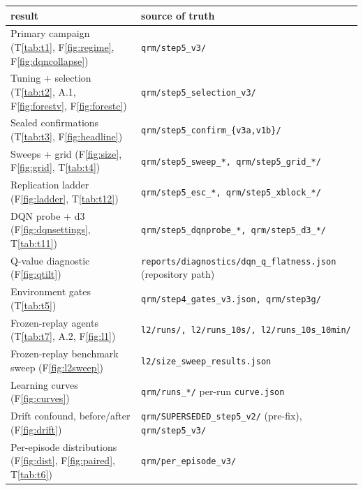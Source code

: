 \documentclass[11pt]{article}
\begin{document}
\begin{center}\small
\begin{tabular}{ll}
\toprule
result & source of truth \\
\midrule
Primary campaign (T\ref{tab:t1}, F\ref{fig:regime}, F\ref{fig:dqncollapse}) & \texttt{qrm/step5\_v3/} \\
Tuning + selection (T\ref{tab:t2}, A.1, F\ref{fig:forestv}, F\ref{fig:forestc}) & \texttt{qrm/step5\_selection\_v3/} \\
Sealed confirmations (T\ref{tab:t3}, F\ref{fig:headline}) & \texttt{qrm/step5\_confirm\_\{v3a,v1b\}/} \\
Sweeps + grid (F\ref{fig:size}, F\ref{fig:grid}, T\ref{tab:t4}) & \texttt{qrm/step5\_sweep\_*, qrm/step5\_grid\_*/} \\
Replication ladder (F\ref{fig:ladder}, T\ref{tab:t12}) & \texttt{qrm/step5\_esc\_*, qrm/step5\_xblock\_*/} \\
DQN probe + d3 (F\ref{fig:dqnsettings}, T\ref{tab:t11}) & \texttt{qrm/step5\_dqnprobe\_*, qrm/step5\_d3\_*/} \\
Q-value diagnostic (F\ref{fig:qtilt}) & \texttt{reports/diagnostics/dqn\_q\_flatness.json} (repository path) \\
Environment gates (T\ref{tab:t5}) & \texttt{qrm/step4\_gates\_v3.json, qrm/step3g/} \\
Frozen-replay agents (T\ref{tab:t7}, A.2, F\ref{fig:l1}) & \texttt{l2/runs/, l2/runs\_10s/, l2/runs\_10s\_10min/} \\
Frozen-replay benchmark sweep (F\ref{fig:l2sweep}) & \texttt{l2/size\_sweep\_results.json} \\
Learning curves (F\ref{fig:curves}) & \texttt{qrm/runs\_*/} per-run \texttt{curve.json} \\
Drift confound, before/after (F\ref{fig:drift}) & \texttt{qrm/SUPERSEDED\_step5\_v2/} (pre-fix), \texttt{qrm/step5\_v3/} \\
Per-episode distributions (F\ref{fig:dist}, F\ref{fig:paired}, T\ref{tab:t6}) & \texttt{qrm/per\_episode\_v3/} \\
\bottomrule
\end{tabular}
\end{center}
\end{document}
